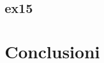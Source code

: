 \documentclass[11pt]{article}
\begin{document}
\subsection{ex15}


\section*{Conclusioni}











\end{document}
